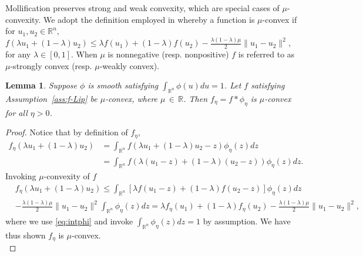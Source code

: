 \documentclass[11pt,reqno]{amsart}
\newcommand{\1}{{\bf 1}}
\newcommand{\2}{{\bf 2}}
\newcommand{\mr}[1]{{\color{blue}#1}}
\newcommand{\us}[1]{\textcolor{red}{#1}}
\numberwithin{equation}{section}
\newtheorem{lemma}{Lemma}[section]
\theoremstyle{remark}
\begin{document}
		Mollification preserves strong and weak convexity, which are special cases of $\mu$-convexity. We adopt the definition employed in \cite{mu_convexity} whereby a function is $\mu$-convex if for $u_1, u_2 \in \mathbb{R}^n$,
		$f(\lambda u_1+(1-\lambda) u_2) \leq \lambda f(u_1)+(1-\lambda) f(u_2)-\frac{\lambda(1-\lambda) \mu}{2}\|u_1-u_2\|^{2}$, for any $\lambda \in[0,1].$ When $\mu$ is nonnegative (resp. nonpositive) $f$ is referred to as $\mu$-strongly convex (resp. $\mu$-weakly convex). %
		\begin{lemma}\label{prop:KeepConvex}
			Suppose $\phi$ is smooth satisfying $\int_{\mathbb{R}^n} \phi(u) d u =1$. Let $f$ satisfying Assumption~\ref{ass:f-Lip} be $\mu$-convex, where $\mu \, \in \, \mathbb{R}$. Then $f_\eta=f * \phi_\eta$ is $\mu$-convex  for all $\eta>0$.
		\end{lemma}
		\begin{proof} %
		Notice that by definition of $f_{\eta}$, 
		\begin{align*}
			f_\eta\left(\lambda u_1+(1-\lambda) u_2\right)
			& =\int_{\mathbb{R}^n} f(\lambda u_1+(1-\lambda) u_2 - z )\phi_\eta(z)dz \\
			&	=\int_{\mathbb{R}^n} f(\lambda (u_1-z)+(1-\lambda) (u_2-z) )\phi_\eta(z)dz.
		\end{align*}	
		Invoking $\mu$-convexity of $f$
		\begin{align*}		
			&f_\eta\left(\lambda u_1+(1-\lambda) u_2\right)  \leq \int_{\mathbb{R}^n} \left[ \lambda f(u_1-z)+ (1-\lambda)f(u_2-z) \right] \phi_\eta(z)dz\\
			&-\frac{\lambda(1-\lambda) \mu}{2}\|u_1-u_2\|^{2}\int_{\mathbb{R}^n} \phi_\eta(z)dz
			=\lambda f_\eta(u_1)+ (1-\lambda) f_\eta(u_2)- \frac{\lambda(1-\lambda) \mu}{2}\|u_1-u_2\|^{2},
		\end{align*}
		where we use \eqref{eq:intphi} and invoke $\int_{\mathbb{R}^n}\phi_\eta (z)dz=1$ by assumption. We have thus shown $f_\eta$ is $\mu$-convex.\\
		
		\end{proof}
		
\end{document}

